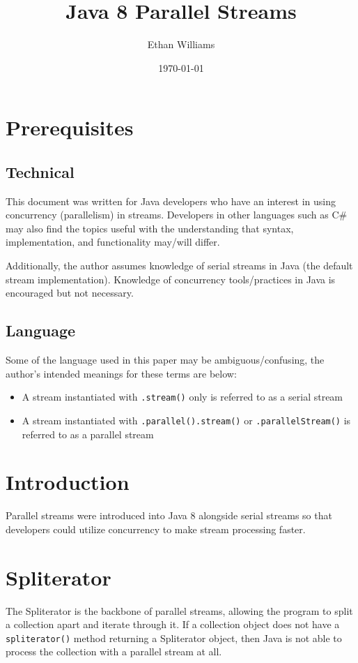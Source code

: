 \documentclass[]{article}
\begin{document}
\title{Java 8 Parallel Streams}
\author{Ethan Williams}
\date{\today}
\maketitle

\tableofcontents

\section*{Prerequisites}
\subsection*{Technical}
This document was written for Java developers who have an interest in using concurrency (parallelism) in streams. Developers in other languages such as C\# may also find the topics useful with the understanding that syntax, implementation, and functionality may/will differ.

Additionally, the author assumes knowledge of serial streams in Java (the default stream implementation). Knowledge of concurrency tools/practices in Java is encouraged but not necessary.
\subsection*{Language}
Some of the language used in this paper may be ambiguous/confusing, the author's intended meanings for these terms are below:
\begin{itemize}
\item A stream instantiated with \verb|.stream()| only is referred to as a serial stream
\item A stream instantiated with \verb|.parallel().stream()| or \verb|.parallelStream()| is referred to as a parallel stream
\end{itemize}
\section{Introduction}
Parallel streams were introduced into Java 8 alongside serial streams so that developers could utilize concurrency to make stream processing faster. 
\section{Spliterator}
The Spliterator is the backbone of parallel streams, allowing the program to split a collection apart and iterate through it. If a collection object does not have a \verb|spliterator()| method returning a Spliterator object, then Java is not able to process the collection with a parallel stream at all.
\end{document}

